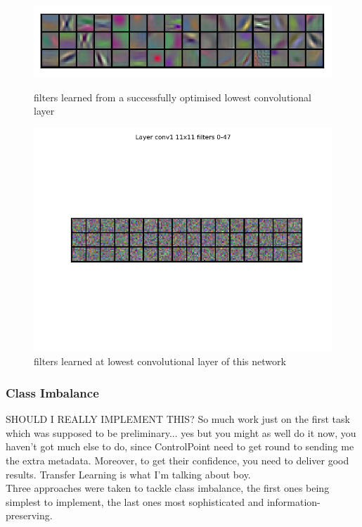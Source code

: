 \documentclass[a4paper,11pt]{article}
\begin{document}
\begin{figure}[h!]
	\centering
	\includegraphics[scale=0.5]{images/good_filters.png} %
	\caption{filters learned from a successfully optimised lowest convolutional layer} 
	\includegraphics[scale=0.5]{images/bad_filters.png}  %
	\caption{filters learned at lowest convolutional layer of this network}
\end{figure}

\subsubsection{Class Imbalance}

SHOULD I REALLY IMPLEMENT THIS? So much work just on the first task which was supposed to be preliminary... yes but you might as well do it now, you haven't got much else to do, since ControlPoint need to get round to sending me the extra metadata. Moreover, to get their confidence, you need to deliver good results. Transfer Learning is what I'm talking about boy. \\

Three approaches were taken to tackle class imbalance, the first ones being simplest to implement, the last ones most sophisticated and information-preserving. \\
\end{document}
